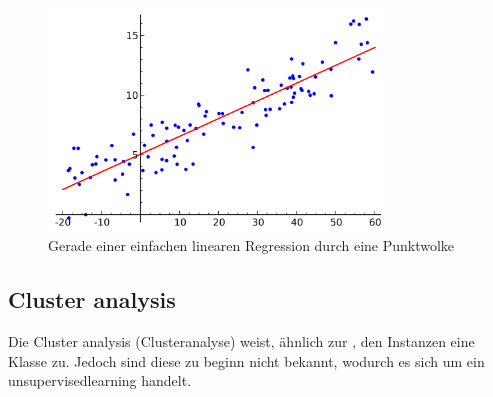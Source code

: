 \begin{figure}[H]
	\RawFloats
	\centering
	\includegraphics[width=0.8\textwidth]{images/Linear_regression.png}
	\caption{Gerade einer einfachen linearen Regression durch eine Punktwolke}
	\label{fig:recherche:dataminingtechniken:disziplinen:regression}
\end{figure}

\subsection{Cluster analysis}
\label{sec:recherche:dataminingtechniken:disziplinen:clusteranalysis}
Die Cluster analysis (Clusteranalyse) weist, ähnlich zur , den Instanzen eine Klasse zu. Jedoch sind diese zu beginn nicht bekannt, wodurch es sich um ein \gls{unsupervisedlearning} handelt.

